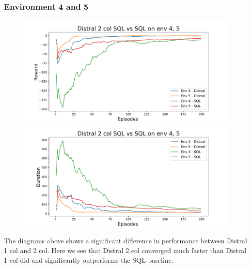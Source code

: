 \documentclass[12pt]{report}
\begin{document}
\subsubsection{Environment 4 and 5}
\begin{figure}[H]
\centering
\begin{minipage}{.5\textwidth}
\centering
\includegraphics[width=\textwidth]{figs/d2_col_sql/d2_col_sql_4_5_rwd.png}
\end{minipage}%
\centering
\begin{minipage}{.5\textwidth}
\centering
\includegraphics[width=\textwidth]{figs/d2_col_sql/d2_col_sql_4_5_dur.png}
\end{minipage}%
\end{figure}
The diagrams above shows a significant difference in performance between Distral 1 col and 2 col. Here we see that Distral 2 col converged much faster than Distral 1 col did and significantly outperforms the SQL baseline.
\end{document}
